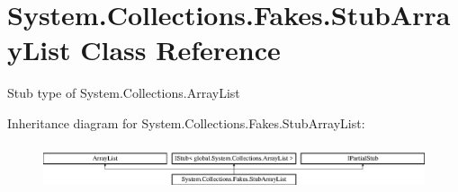 \hypertarget{class_system_1_1_collections_1_1_fakes_1_1_stub_array_list}{\section{System.\-Collections.\-Fakes.\-Stub\-Array\-List Class Reference}
\label{class_system_1_1_collections_1_1_fakes_1_1_stub_array_list}
}


Stub type of System.\-Collections.\-Array\-List 


Inheritance diagram for System.\-Collections.\-Fakes.\-Stub\-Array\-List\-:\begin{figure}[H]
\begin{center}
\leavevmode
\includegraphics[height=1.372549cm]{class_system_1_1_collections_1_1_fakes_1_1_stub_array_list}
\end{center}
\end{figure}
